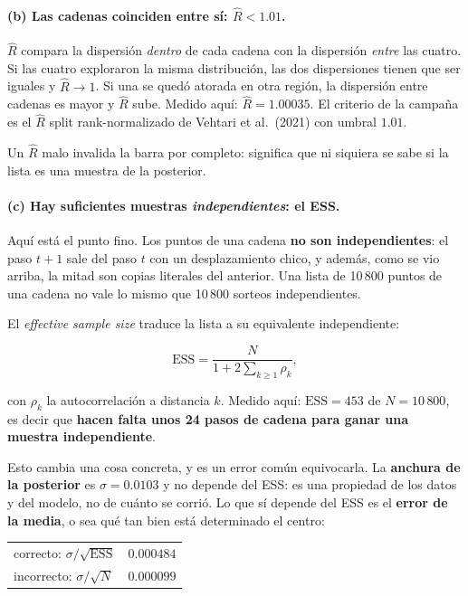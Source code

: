 \documentclass[11pt,a4paper]{article}
\begin{document}
\paragraph{(b) Las cadenas coinciden entre sí: $\hat{R} < 1.01$.} $\hat{R}$
compara la dispersión \emph{dentro} de cada cadena con la dispersión
\emph{entre} las cuatro. Si las cuatro exploraron la misma distribución, las
dos dispersiones tienen que ser iguales y $\hat{R} \to 1$. Si una se quedó
atorada en otra región, la dispersión entre cadenas es mayor y $\hat{R}$ sube.
Medido aquí: $\hat{R} = 1.00035$. El criterio de la campaña es el $\hat{R}$
split rank-normalizado de Vehtari et al.\ (2021) con umbral $1.01$.

Un $\hat{R}$ malo invalida la barra por completo: significa que ni siquiera se
sabe si la lista es una muestra de la posterior.

\paragraph{(c) Hay suficientes muestras \emph{independientes}: el ESS.} Aquí
está el punto fino. Los puntos de una cadena \textbf{no son independientes}:
el paso $t+1$ sale del paso $t$ con un desplazamiento chico, y además, como se
vio arriba, la mitad son copias literales del anterior. Una lista de 10\,800
puntos de una cadena no vale lo mismo que 10\,800 sorteos independientes.

El \emph{effective sample size} traduce la lista a su equivalente
independiente:

\begin{equation}
  \mathrm{ESS} = \frac{N}{1 + 2\sum_{k\ge 1}\rho_k},
\end{equation}

\noindent
con $\rho_k$ la autocorrelación a distancia $k$. Medido aquí:
$\mathrm{ESS} = 453$ de $N = 10\,800$, es decir que \textbf{hacen falta unos
24 pasos de cadena para ganar una muestra independiente}.

Esto cambia una cosa concreta, y es un error común equivocarla. La
\textbf{anchura de la posterior} es $\sigma = 0.0103$ y no depende del ESS: es
una propiedad de los datos y del modelo, no de cuánto se corrió. Lo que sí
depende del ESS es el \textbf{error de la media}, o sea qué tan bien está
determinado el centro:

\begin{center}
\small
\begin{tabular}{lr}
\toprule
correcto: $\sigma / \sqrt{\mathrm{ESS}}$ & $0.000484$ \\
incorrecto: $\sigma / \sqrt{N}$ & $0.000099$ \\
\bottomrule
\end{tabular}
\end{center}
\end{document}

